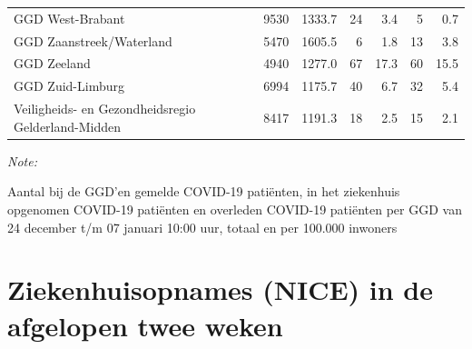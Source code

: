 \documentclass[
  english,
  man,floatsintext]{apa6}
\begin{document}
\begin{table}
\begin{threeparttable}
\begin{tabular}{lrrrrrr}
GGD West-Brabant & 9530 & 1333.7 & 24 & 3.4 & 5 & 0.7\\
GGD Zaanstreek/Waterland & 5470 & 1605.5 & 6 & 1.8 & 13 & 3.8\\
GGD Zeeland & 4940 & 1277.0 & 67 & 17.3 & 60 & 15.5\\
GGD Zuid-Limburg & 6994 & 1175.7 & 40 & 6.7 & 32 & 5.4\\
Veiligheids- en Gezondheidsregio Gelderland-Midden & 8417 & 1191.3 & 18 & 2.5 & 15 & 2.1\\
\bottomrule
\end{tabular}
\begin{tablenotes}
\item \textit{Note: } 
\item Aantal bij de GGD’en gemelde COVID-19 patiënten, in het ziekenhuis opgenomen COVID-19 patiënten en overleden COVID-19 patiënten per GGD van 24 december t/m 07 januari 10:00 uur, totaal en per 100.000 inwoners
\end{tablenotes}
\end{threeparttable}
\endgroup{}
\end{table}

\newpage

\hypertarget{ziekenhuisopnames-nice-in-de-afgelopen-twee-weken}{%
\section{Ziekenhuisopnames (NICE) in de afgelopen twee weken}\label{ziekenhuisopnames-nice-in-de-afgelopen-twee-weken}}
\end{document}
